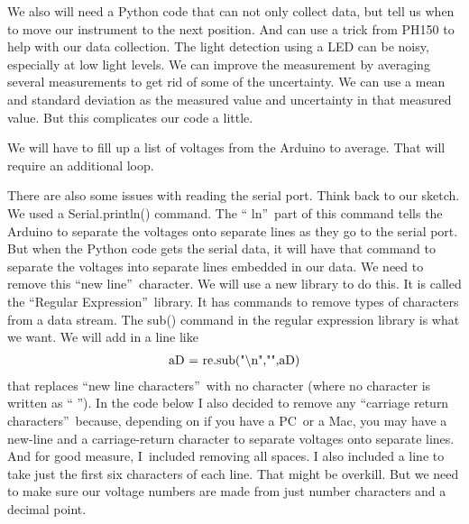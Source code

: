 We also will need a Python code that can not only collect data, but tell us
when to move our instrument to the next position. And can use a trick from
PH150 to help with our data collection. The light detection using a LED can
be noisy, especially at low light levels. We can improve the measurement by
averaging several measurements to get rid of some of the uncertainty. We can
use a mean and standard deviation as the measured value and uncertainty in
that measured value. But this complicates our code a little.

We will have to fill up a list of voltages from the Arduino to average. That
will require an additional loop.

There are also some issues with reading the serial port. Think back to our
sketch. We used a Serial.println() command. The \textquotedblleft
ln\textquotedblright\ part of this command tells the Arduino to separate the
voltages onto separate lines as they go to the serial port. But when the
Python code gets the serial data, it will have that command to separate the
voltages into separate lines embedded in our data. We need to remove this
\textquotedblleft new line\textquotedblright\ character. We will use a new
library to do this. It is called the \textquotedblleft Regular
Expression\textquotedblright\ library. It has commands to remove types of
characters from a data stream. The sub() command in the regular expression
library is what we want. We will add in a line like 
\begin{equation*}
\begin{tabular}{l}
aD = re.sub("$\backslash$n","",aD)%
\end{tabular}%
\end{equation*}%
that replaces \textquotedblleft new line characters\textquotedblright\ with
no character (where no character is written as \textquotedblleft
\textquotedblright ). In the code below I also decided to remove any
\textquotedblleft carriage return characters\textquotedblright\ because,
depending on if you have a PC\ or a Mac, you may have a new-line and a
carriage-return character to separate voltages onto separate lines. And for
good measure, I\ included removing all spaces. I also included a line to
take just the first six characters of each line. That might be overkill. But
we need to make sure our voltage numbers are made from just number
characters and a decimal point.

